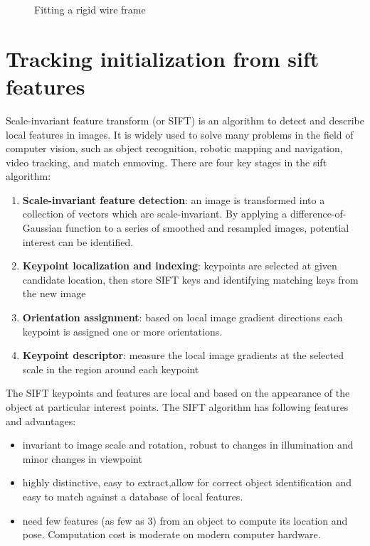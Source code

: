 \begin{figure}
\begin{minipage}[t]{0.45\linewidth}
    \label{subfig:iteration 3}
  \end{minipage} 
  \begin{minipage}[t]{0.45\linewidth} 
    \centering 
  \end{minipage} 
\caption{Fitting a rigid wire frame}
\end{figure}


\section{Tracking initialization from sift features}

Scale-invariant feature transform (or SIFT) is an algorithm to detect
and describe local features in images.  It is widely used to solve
many problems in the field of computer vision, such as object
recognition, robotic mapping and navigation, video tracking, and match
enmoving. There are four key stages in the sift algorithm\cite{lowe2004distinctive}:
\begin{enumerate}
\item \textbf{Scale-invariant feature detection}: an image is transformed into
  a collection of vectors which are scale-invariant. By applying a difference-of-Gaussian
function to a series of smoothed and resampled images, potential
interest can be identified.
\item \textbf{Keypoint localization and indexing}: keypoints are selected at given
  candidate location, then store SIFT keys and identifying matching keys from the new image
\item \textbf{Orientation assignment}:  based on local image gradient
  directions each keypoint is assigned one or more orientations.
\item \textbf{Keypoint descriptor}: measure the local image gradients
  at the selected scale in the region around each keypoint
\end{enumerate}


The SIFT keypoints and features are local and based on the appearance
of the object at particular interest points. The SIFT algorithm has following
features and advantages:
\begin{itemize}
\item invariant to image scale and rotation, robust to changes in
  illumination and minor changes in viewpoint
\item highly distinctive, easy to extract,allow for correct object
  identification and easy to match against a database of local
  features. 
\item need few features (as few as 3) from an object to compute its location
  and pose. Computation cost is moderate on modern computer hardware.
\end{itemize}

